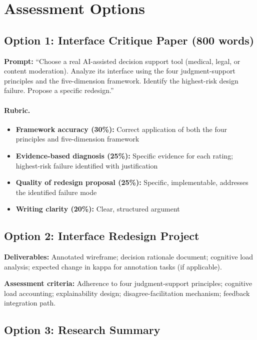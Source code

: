 \section{Assessment Options}

\subsection{Option 1: Interface Critique Paper (800 words)}

\textbf{Prompt:} ``Choose a real AI-assisted decision support tool (medical, legal, or content moderation). Analyze its interface using the four judgment-support principles and the five-dimension framework. Identify the highest-risk design failure. Propose a specific redesign.''

\paragraph{Rubric.}
\begin{itemize}
    \item \textbf{Framework accuracy (30\%):} Correct application of both the four principles and five-dimension framework
    \item \textbf{Evidence-based diagnosis (25\%):} Specific evidence for each rating; highest-risk failure identified with justification
    \item \textbf{Quality of redesign proposal (25\%):} Specific, implementable, addresses the identified failure mode
    \item \textbf{Writing clarity (20\%):} Clear, structured argument
\end{itemize}

\subsection{Option 2: Interface Redesign Project}

\textbf{Deliverables:} Annotated wireframe; decision rationale document; cognitive load analysis; expected change in kappa for annotation tasks (if applicable).

\textbf{Assessment criteria:} Adherence to four judgment-support principles; cognitive load accounting; explainability design; disagree-facilitation mechanism; feedback integration path.

\subsection{Option 3: Research Summary}

